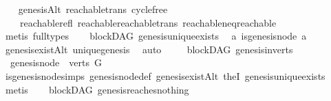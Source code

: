 \begin{isabellebody}
%
\isadelimproof
\ \ %
\endisadelimproof
%
\isatagproof
{}\isamarkupfalse%
\ genesisAlt\ reachable{\isacharunderscore}{\kern0pt}trans\ cycle{\isacharunderscore}{\kern0pt}free\isanewline
\ \ \ \ reachable{\isacharunderscore}{\kern0pt}refl\ reachable{\isacharunderscore}{\kern0pt}reachable{}{\isacharunderscore}{\kern0pt}trans\ reachable{\isacharunderscore}{\kern0pt}neq{\isacharunderscore}{\kern0pt}reachable{}\isanewline
\ \ \isamarkupfalse%
\ {\isacharparenleft}{\kern0pt}metis\ {\isacharparenleft}{\kern0pt}full{\isacharunderscore}{\kern0pt}types{\isacharparenright}{\kern0pt}{\isacharparenright}{\kern0pt}%
\endisatagproof
{\isafoldproof}%
%
\isadelimproof
\ \isanewline
%
\endisadelimproof
\isanewline
{}\isamarkupfalse%
\ {\isacharparenleft}{\kern0pt}\ blockDAG{\isacharparenright}{\kern0pt}\ genesis{\isacharunderscore}{\kern0pt}unique{\isacharunderscore}{\kern0pt}exists{\isacharcolon}{\kern0pt}\isanewline
\ \ {\isachardoublequoteopen}{\isasymexists}{\isacharbang}{\kern0pt}a{\isachardot}{\kern0pt}\ is{\isacharunderscore}{\kern0pt}genesis{\isacharunderscore}{\kern0pt}node\ a{\isachardoublequoteclose}\isanewline
%
\isadelimproof
\ \ %
\endisadelimproof
%
\isatagproof
{}\isamarkupfalse%
\ genesis{\isacharunderscore}{\kern0pt}existAlt\ unique{\isacharunderscore}{\kern0pt}genesis\ \isamarkupfalse%
\ auto%
\endisatagproof
{\isafoldproof}%
%
\isadelimproof
\ \ \isanewline
%
\endisadelimproof
\isanewline
{}\isamarkupfalse%
\ {\isacharparenleft}{\kern0pt}\ blockDAG{\isacharparenright}{\kern0pt}\ genesis{\isacharunderscore}{\kern0pt}in{\isacharunderscore}{\kern0pt}verts{\isacharcolon}{\kern0pt}\isanewline
\ \ {\isachardoublequoteopen}genesis{\isacharunderscore}{\kern0pt}node\ {\isasymin}\ verts\ G{\isachardoublequoteclose}\isanewline
%
\isadelimproof
\ \ %
\endisadelimproof
%
\isatagproof
{}\isamarkupfalse%
\ is{\isacharunderscore}{\kern0pt}genesis{\isacharunderscore}{\kern0pt}node{\isachardot}{\kern0pt}simps\ genesis{\isacharunderscore}{\kern0pt}node{\isacharunderscore}{\kern0pt}def\ genesis{\isacharunderscore}{\kern0pt}existAlt\ the{}I{}\ genesis{\isacharunderscore}{\kern0pt}unique{\isacharunderscore}{\kern0pt}exists\isanewline
\ \ \isamarkupfalse%
\ metis%
\endisatagproof
{\isafoldproof}%
%
\isadelimproof
\ \isanewline
%
\endisadelimproof
\isanewline
{}\isamarkupfalse%
\ {\isacharparenleft}{\kern0pt}\ blockDAG{\isacharparenright}{\kern0pt}\ genesis{\isacharunderscore}{\kern0pt}reaches{\isacharunderscore}{\kern0pt}nothing{\isacharcolon}{\kern0pt}\isanewline

\end{isabellebody}
